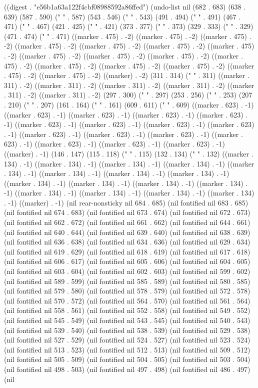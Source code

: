 
((digest . "e56b1a63a122f4cbf08988592a86ffed") (undo-list nil (682 . 683) (638 . 639) (587 . 590) ("  " . 587) (543 . 546) ("  " . 543) (491 . 494) (" " . 491) (467 . 471) ("   " . 467) (421 . 425) ("   " . 421) (373 . 377) ("   " . 373) (329 . 333) ("   " . 329) (471 . 474) ("  " . 471) ((marker . 475) . -2) ((marker . 475) . -2) ((marker . 475) . -2) ((marker . 475) . -2) ((marker . 475) . -2) ((marker . 475) . -2) ((marker . 475) . -2) ((marker . 475) . -2) ((marker . 475) . -2) ((marker . 475) . -2) ((marker . 475) . -2) ((marker . 475) . -2) ((marker . 475) . -2) ((marker . 475) . -2) ((marker . 475) . -2) ((marker . 475) . -2) ((marker) . -2) (311 . 314) ("  " . 311) ((marker . 311) . -2) ((marker . 311) . -2) ((marker . 311) . -2) ((marker . 311) . -2) ((marker . 311) . -2) ((marker . 311) . -2) (297 . 300) ("  " . 297) (253 . 256) ("  " . 253) (207 . 210) ("  " . 207) (161 . 164) ("  " . 161) (609 . 611) (" " . 609) ((marker . 623) . -1) ((marker . 623) . -1) ((marker . 623) . -1) ((marker . 623) . -1) ((marker . 623) . -1) ((marker . 623) . -1) ((marker . 623) . -1) ((marker . 623) . -1) ((marker . 623) . -1) ((marker . 623) . -1) ((marker . 623) . -1) ((marker . 623) . -1) ((marker . 623) . -1) ((marker . 623) . -1) ((marker . 623) . -1) ((marker . 623) . -1) ((marker) . -1) (146 . 147) (115 . 118) (" " . 115) (132 . 134) (" " . 132) ((marker . 134) . -1) ((marker . 134) . -1) ((marker . 134) . -1) ((marker . 134) . -1) ((marker . 134) . -1) ((marker . 134) . -1) ((marker . 134) . -1) ((marker . 134) . -1) ((marker . 134) . -1) ((marker . 134) . -1) ((marker . 134) . -1) ((marker . 134) . -1) ((marker . 134) . -1) ((marker . 134) . -1) ((marker . 134) . -1) ((marker . 134) . -1) ((marker) . -1) (nil rear-nonsticky nil 684 . 685) (nil fontified nil 683 . 685) (nil fontified nil 674 . 683) (nil fontified nil 673 . 674) (nil fontified nil 672 . 673) (nil fontified nil 662 . 672) (nil fontified nil 661 . 662) (nil fontified nil 644 . 661) (nil fontified nil 640 . 644) (nil fontified nil 639 . 640) (nil fontified nil 638 . 639) (nil fontified nil 636 . 638) (nil fontified nil 634 . 636) (nil fontified nil 629 . 634) (nil fontified nil 619 . 629) (nil fontified nil 618 . 619) (nil fontified nil 617 . 618) (nil fontified nil 606 . 617) (nil fontified nil 605 . 606) (nil fontified nil 604 . 605) (nil fontified nil 603 . 604) (nil fontified nil 602 . 603) (nil fontified nil 599 . 602) (nil fontified nil 589 . 599) (nil fontified nil 585 . 589) (nil fontified nil 580 . 585) (nil fontified nil 579 . 580) (nil fontified nil 578 . 579) (nil fontified nil 572 . 578) (nil fontified nil 570 . 572) (nil fontified nil 564 . 570) (nil fontified nil 561 . 564) (nil fontified nil 558 . 561) (nil fontified nil 552 . 558) (nil fontified nil 549 . 552) (nil fontified nil 545 . 549) (nil fontified nil 543 . 545) (nil fontified nil 540 . 543) (nil fontified nil 539 . 540) (nil fontified nil 538 . 539) (nil fontified nil 529 . 538) (nil fontified nil 527 . 529) (nil fontified nil 524 . 527) (nil fontified nil 523 . 524) (nil fontified nil 513 . 523) (nil fontified nil 512 . 513) (nil fontified nil 509 . 512) (nil fontified nil 505 . 509) (nil fontified nil 504 . 505) (nil fontified nil 503 . 504) (nil fontified nil 498 . 503) (nil fontified nil 497 . 498) (nil fontified nil 486 . 497) (nil 